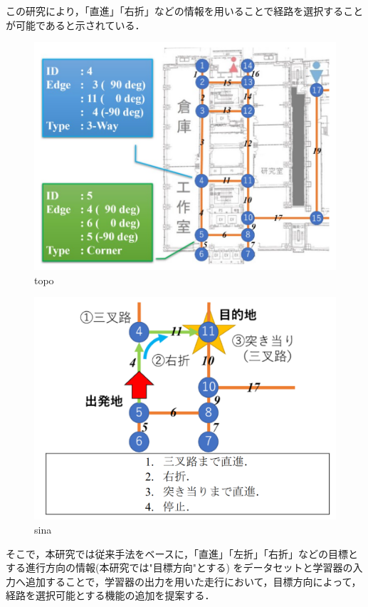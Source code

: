 この研究により，「直進」「右折」などの情報を用いることで経路を選択することが可能であると示されている．
\begin{figure}[H]
    \centering
    \includegraphics[width = 13cm]{./figs/topo.png}
    \caption{topo\cite{razikon}}
    \label{fig::topo}
\end{figure}
\begin{figure}[H]
    \centering
    \includegraphics[width = 13cm]{./figs/sina.png}
    \caption{sina\cite{razikon}}
    \label{fig::sina}
\end{figure}

そこで，本研究では従来手法をベースに，「直進」「左折」「右折」などの目標とする進行方向の情報(本研究では"目標方向"とする)
をデータセットと学習器の入力へ追加することで，学習器の出力を用いた走行において，目標方向によって，経路を選択可能とする機能の追加を提案する．

